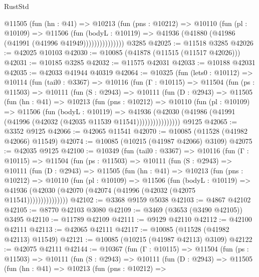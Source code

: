 \begin{lexlean}{RustStd}
\begin{coremodule}
                @11505
                  (fun (hn : @41) =>
                  @10213
                    (fun (pns : @10212) =>
                    @10110
                      (fun (pl : @10109) =>
                      @11506
                        (fun (bodyL : @10119) =>
                        @41936 (@41880 (@41986 (@41991 (@41996 @41949)))))))))))))))
    @3285
@42025 := @11518 @3285
@42026 := @42025 @10103
@42030 := @10085 (@41878 (@11515 (@11517 @42026)))
@42031 := @10185 @3285
@42032 := @11575 @42031
@42033 := @10188 @42031
@42035 := @42033 @41944 @40319
@42064 := @10325
    (fun (lets0 : @10112) =>
    @10114
      (fun (tail0 : @3367) =>
      @10116
        (fun (Γ : @10115) =>
        @11504
          (fun (ps : @11503) =>
          @10111
            (fun (S : @2943) =>
            @10111
              (fun (D : @2943) =>
              @11505
                (fun (hn : @41) =>
                @10213
                  (fun (pns : @10212) =>
                  @10110
                    (fun (pl : @10109) =>
                    @11506
                      (fun (bodyL : @10119) =>
                      @41936
                        (@42030
                          (@41986 (@41991 (@41996 (@42032 (@42035 @11539 @11541))))))))))))))))
    @9125
@42065 := @3352 @9125
@42066 := @42065 @11541
@42070 := @10085 (@11528 (@41982 @42066) @11549)
@42074 := @10085 (@10215 (@41987 @42066) @3109)
@42075 := @42035 @9125
@42100 := @10349
    (fun (tail0 : @3367) =>
    @10116
      (fun (Γ : @10115) =>
      @11504
        (fun (ps : @11503) =>
        @10111
          (fun (S : @2943) =>
          @10111
            (fun (D : @2943) =>
            @11505
              (fun (hn : @41) =>
              @10213
                (fun (pns : @10212) =>
                @10110
                  (fun (pl : @10109) =>
                  @11506
                    (fun (bodyL : @10119) =>
                    @41936 (@42030 (@42070 (@42074 (@41996 (@42032 (@42075 @11541)))))))))))))))
@42102 := @3368 @9159 @5038
@42103 := @4867 @42102
@42105 := @8770 @42103 @3080
@42109 := @3469 (@3653 (@3490 @42105)) @3495
@42110 := @11789 @42109
@42111 := @9129 @42110
@42112 := @42100 @42111
@42113 := @42065 @42111
@42117 := @10085 (@11528 (@41982 @42113) @11549)
@42121 := @10085 (@10215 (@41987 @42113) @3109)
@42122 := @42075 @42111
@42144 := @10367
    (fun (Γ : @10115) =>
    @11504
      (fun (ps : @11503) =>
      @10111
        (fun (S : @2943) =>
        @10111
          (fun (D : @2943) =>
          @11505
            (fun (hn : @41) =>
            @10213
              (fun (pns : @10212) =>

\end{coremodule}
\end{lexlean}
